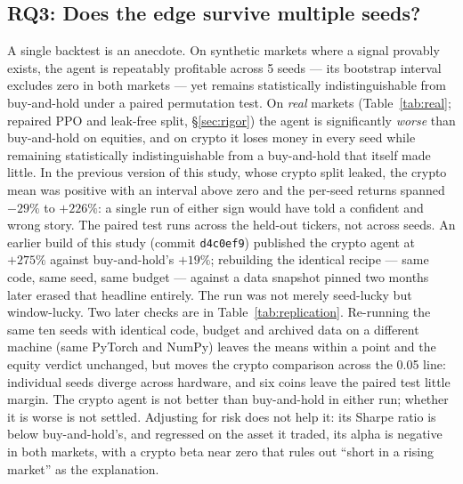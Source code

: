 \documentclass[10pt,twocolumn]{article}
\newcommand{\pc}{\%}  %
\begin{document}
\subsection{RQ3: Does the edge survive multiple seeds?}
\label{sec:sig}
A single backtest is an anecdote. On synthetic markets where a signal provably
exists, the agent is repeatably profitable across 5 seeds --- its bootstrap
interval excludes zero in both markets --- yet remains statistically
indistinguishable from buy-and-hold under a paired permutation test. On
\emph{real} markets (Table~\ref{tab:real}; repaired PPO and leak-free split,
\S\ref{sec:rigor}) the agent is significantly \emph{worse} than buy-and-hold on
equities, and on crypto it loses money in every seed while remaining statistically
indistinguishable from a buy-and-hold that itself made little. In the previous
version of this study, whose crypto split leaked, the crypto mean was positive with
an interval above zero and the per-seed returns spanned $-29\pc$ to $+226\pc$: a
single run of either sign would have told a confident and wrong story. The paired test runs
across the held-out tickers, not across seeds. An earlier build of this study
(commit \texttt{d4c0ef9}) published the crypto agent at $+275\pc$ against
buy-and-hold's $+19\pc$; rebuilding the identical recipe --- same code, same seed,
same budget --- against a data snapshot pinned two months later erased that
headline entirely. The run was not merely seed-lucky but window-lucky.
Two later checks are in Table~\ref{tab:replication}. Re-running the same ten
seeds with identical code, budget and archived data on a different machine (same
PyTorch and NumPy) leaves the means within a point and the equity verdict unchanged,
but moves the crypto comparison across the 0.05 line: individual seeds diverge
across hardware, and six coins leave the paired test little margin. The crypto agent
is not better than buy-and-hold in either run; whether it is worse is not settled.
Adjusting for risk does not help it: its Sharpe ratio is below buy-and-hold's, and
regressed on the asset it traded, its alpha is negative in both markets, with a
crypto beta near zero that rules out ``short in a rising market'' as the explanation.
\end{document}
